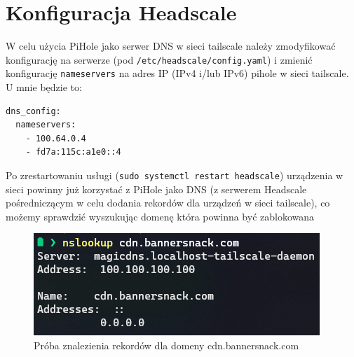 \documentclass[../main.tex]{subfiles}
\begin{document}
\section{Konfiguracja Headscale}
W celu użycia PiHole jako serwer DNS w sieci tailscale należy zmodyfikować konfigurację na serwerze (pod \texttt{/etc/headscale/config.yaml}) i zmienić konfigurację \texttt{nameservers} na adres IP (IPv4 i/lub IPv6) pihole w sieci tailscale. U mnie będzie to:
\begin{verbatim}
dns_config:
  nameservers:
    - 100.64.0.4
    - fd7a:115c:a1e0::4
\end{verbatim}
Po zrestartowaniu usługi (\texttt{sudo systemctl restart headscale}) urządzenia w sieci powinny już korzystać z PiHole jako DNS (z serwerem Headscale pośredniczącym w celu dodania rekordów dla urządzeń w sieci tailscale), co możemy sprawdzić wyszukując domenę która powinna być zablokowana
\begin{figure}[H]
    \centering
    \includegraphics[scale=0.75]{pihole-test.png}
    \caption{Próba znalezienia rekordów dla domeny cdn.bannersnack.com}
    \label{fig:pihole_test}
\end{figure}
\end{document}
